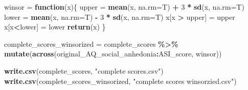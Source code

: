 \documentclass[
]{article}
\newenvironment{Shaded}{\begin{snugshade}}{\end{snugshade}}
\newcommand{\AttributeTok}[1]{\textcolor[rgb]{0.13,0.29,0.53}{#1}}
\newcommand{\ControlFlowTok}[1]{\textcolor[rgb]{0.13,0.29,0.53}{\textbf{#1}}}
\newcommand{\DecValTok}[1]{\textcolor[rgb]{0.00,0.00,0.81}{#1}}
\newcommand{\FunctionTok}[1]{\textcolor[rgb]{0.13,0.29,0.53}{\textbf{#1}}}
\newcommand{\NormalTok}[1]{#1}
\newcommand{\OtherTok}[1]{\textcolor[rgb]{0.56,0.35,0.01}{#1}}
\newcommand{\SpecialCharTok}[1]{\textcolor[rgb]{0.81,0.36,0.00}{\textbf{#1}}}
\newcommand{\StringTok}[1]{\textcolor[rgb]{0.31,0.60,0.02}{#1}}
\begin{document}
\begin{Shaded}
\begin{Highlighting}[]
\NormalTok{winsor }\OtherTok{=} \ControlFlowTok{function}\NormalTok{(x)\{}
\NormalTok{  upper }\OtherTok{=} \FunctionTok{mean}\NormalTok{(x, }\AttributeTok{na.rm=}\NormalTok{T) }\SpecialCharTok{+} \DecValTok{3} \SpecialCharTok{*} \FunctionTok{sd}\NormalTok{(x, }\AttributeTok{na.rm=}\NormalTok{T)}
\NormalTok{  lower }\OtherTok{=} \FunctionTok{mean}\NormalTok{(x, }\AttributeTok{na.rm=}\NormalTok{T) }\SpecialCharTok{{-}} \DecValTok{3} \SpecialCharTok{*} \FunctionTok{sd}\NormalTok{(x, }\AttributeTok{na.rm=}\NormalTok{T)}
\NormalTok{  x[x }\SpecialCharTok{\textgreater{}}\NormalTok{ upper] }\OtherTok{=}\NormalTok{ upper}
\NormalTok{  x[x}\SpecialCharTok{\textless{}}\NormalTok{lower] }\OtherTok{=}\NormalTok{ lower}
  \FunctionTok{return}\NormalTok{(x)}
\NormalTok{\}}

\NormalTok{complete\_scores\_winsorized }\OtherTok{=}\NormalTok{ complete\_scores }\SpecialCharTok{\%\textgreater{}\%} \FunctionTok{mutate}\NormalTok{(}\FunctionTok{across}\NormalTok{(original\_AQ\_social\_anhedonia}\SpecialCharTok{:}\NormalTok{ASI\_score, winsor))}
\end{Highlighting}
\end{Shaded}

\begin{Shaded}
\begin{Highlighting}[]
\FunctionTok{write.csv}\NormalTok{(complete\_scores, }\StringTok{"complete scores.csv"}\NormalTok{)}
\FunctionTok{write.csv}\NormalTok{(complete\_scores\_winsorized, }\StringTok{"complete scores winsorzied.csv"}\NormalTok{)}
\end{Highlighting}
\end{Shaded}
\end{document}
